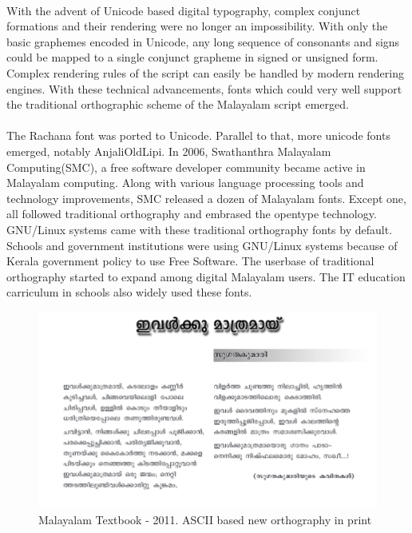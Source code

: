 \documentclass[10pt]{article}
\begin{document}
\paragraph{}
With the advent of Unicode based digital typography, complex conjunct formations and their rendering were no longer an impossibility. With only the basic graphemes encoded in Unicode, any long sequence of consonants and signs could be mapped to a single conjunct grapheme in signed or unsigned form. Complex rendering rules of the script can easily be handled by modern rendering engines. With these technical advancements, fonts which could very well support the traditional orthographic scheme of the Malayalam script emerged. 

\paragraph{}
The Rachana font was ported to Unicode. Parallel to that, more unicode fonts emerged, notably AnjaliOldLipi. In 2006, Swathanthra Malayalam Computing(SMC), a free software developer community became active in Malayalam computing. Along with various language processing tools and technology improvements, SMC released a dozen of Malayalam fonts. Except one, all followed traditional orthography and embrased the opentype technology. GNU/Linux systems came with these traditional orthography fonts by default. Schools and government institutions were using GNU/Linux systems because of Kerala government policy to use Free Software. The userbase of traditional orthography started to expand among digital Malayalam users. The IT education carriculum in schools also widely used these fonts.

\begin{figure}[H]
	\centering
	\includegraphics[scale=0.5]{images/2011-Malayalam-Textbook.png}
	\caption{Malayalam Textbook - 2011. ASCII based new orthography in print}
	\label{textbook2011}
\end{figure}
\end{document}
